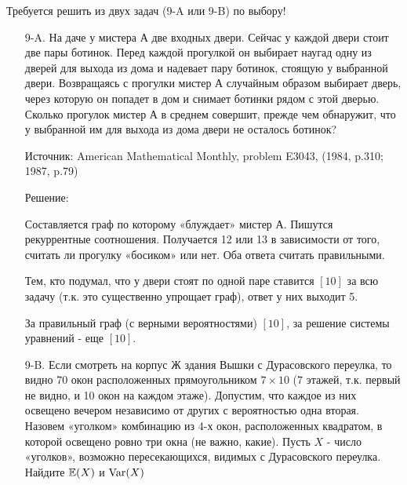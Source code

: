 \documentclass[12pt, a4paper]{article}\usepackage[]{graphicx}\usepackage[]{color}
\begin{document}
Требуется решить \textbf{} из двух задач (9-A или 9-B) по
выбору!

\begin{enumerate}
\item[9-A.] На даче у мистера А две входных двери. Сейчас у каждой двери стоит две пары ботинок. Перед каждой прогулкой он выбирает наугад одну из дверей для выхода из дома и надевает пару ботинок, стоящую у выбранной двери. Возвращаясь с прогулки мистер А случайным образом выбирает дверь, через которую он попадет в дом и снимает ботинки рядом с этой дверью. Сколько прогулок мистер А в среднем совершит, прежде чем обнаружит, что у выбранной им для выхода из дома двери не осталось ботинок?

Источник: American Mathematical Monthly, problem E3043, (1984, p.310; 1987, p.79)

Решение:

Составляется граф по которому «блуждает» мистер А. Пишутся рекуррентные соотношения.
Получается 12 или 13 в зависимости от того, считать ли прогулку «босиком» или нет.
Оба ответа считать правильными.

Тем, кто подумал, что у двери стоят по одной паре ставится $[10]$ за всю задачу (т.к. это существенно упрощает граф), ответ у них выходит 5.

За правильный граф (с верными вероятностями) $[10]$, за решение системы уравнений - еще $[10]$.

\item[9-B.] Если смотреть на корпус Ж здания Вышки с Дурасовского переулка, то видно 70 окон расположенных прямоугольником $7\times 10$ (7 этажей, т.к. первый не видно, и 10 окон на каждом этаже). Допустим, что каждое из них освещено вечером независимо от других с вероятностью одна вторая. Назовем «уголком» комбинацию из 4-х окон, расположенных квадратом, в которой освещено ровно три окна (не важно, какие). Пусть $X$ - число «уголков», возможно пересекающихся, видимых с Дурасовского переулка.
Найдите  $\mathbb{E}(X)$ и $\operatorname{Var}(X)$


\end{enumerate}
\end{document}
